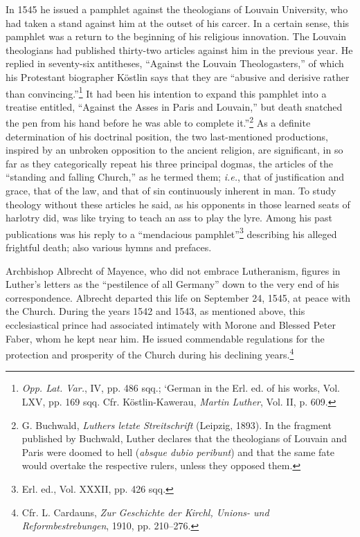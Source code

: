 In 1545 he issued a pamphlet against the theologians of Louvain
University, who had taken a stand against him at the outset of his
carcer. In a certain sense, this pamphlet was a return to the beginning
of his religious innovation. The Louvain theologians had published thirty-two
articles against him in the previous year. He replied in seventy-six antitheses,
“Against the Louvain Theologasters,”
of which his Protestant biographer Köstlin says that they are “abusive
and derisive rather than convincing.”\footnote
{\textit{Opp. Lat. Var.}, IV, pp. 486 sqq.; ‘German in the Erl. ed. of his works, Vol. LXV, pp.
169 sqq. Cfr. Köstlin-Kawerau, \textit{Martin Luther}, Vol. II, p. 609.}
It had been his intention to
expand this pamphlet into a treatise entitled, “Against the Asses in
Paris and Louvain,” but death snatched the pen from his hand before
he was able to complete it.”\footnote
{G. Buchwald, \textit{Luthers letzte Streitschrift} (Leipzig, 1893). In the fragment published
by Buchwald, Luther declares that the theologians of Louvain and Paris were doomed to
hell (\textit{absque dubio peribunt}) and that the same fate would overtake the respective rulers,
unless they opposed them.}
As a definite determination of his doctrinal
position, the two last-mentioned productions, inspired by an
unbroken opposition to the ancient religion, are significant, in so far
as they categorically repeat his three principal dogmas, the articles
of the “standing and falling Church,” as he termed them; \textit{i.e.}, that
of justification and grace, that of the law, and that of sin continuously
inherent in man. To study theology without these articles he said,
as his opponents in those learned seats of harlotry did, was like trying
to teach an ass to play the lyre. Among his past publications was
his reply to a “mendacious pamphlet”\footnote{Erl. ed., Vol. XXXII, pp. 426 sqq.}
 describing his alleged frightful
death; also various hymns and prefaces.

Archbishop Albrecht of Mayence, who did not embrace Lutheranism, figures
in Luther’s letters as the “pestilence of all Germany”
down to the very end of his correspondence. Albrecht departed this
life on September 24, 1545, at peace with the Church. During the
years 1542 and 1543, as mentioned above, this ecclesiastical prince
had associated intimately with Morone and Blessed Peter Faber, whom
he kept near him. He issued commendable regulations for the protection
and prosperity of the Church during his declining years.\footnote
{Cfr. L. Cardauns, \textit{Zur Geschichte der Kirchl, Unions- und Reformbestrebungen}, 1910,
pp. 210--276.}

